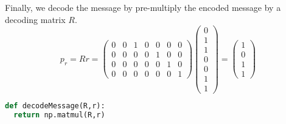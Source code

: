 \documentclass[12pt]{article}
\begin{document}
Finally, we decode the message by pre-multiply the encoded message by a decoding matrix $R$.
\[
  p_r = Rr = 
  \begin{pmatrix}
    0 & 0 & 1 & 0 & 0 & 0 & 0 \\
    0 & 0 & 0 & 0 & 1 & 0 & 0 \\
    0 & 0 & 0 & 0 & 0 & 1 & 0 \\
    0 & 0 & 0 & 0 & 0 & 0 & 1 
  \end{pmatrix} 
  \begin{pmatrix}
    0 \\
    1 \\
    1 \\
    0 \\
    0 \\
    1 \\
    1 
  \end{pmatrix} 
  =
  \begin{pmatrix}
    1 \\
    0 \\
    1 \\
    1
  \end{pmatrix} 
\]
\begin{lstlisting}[frame=single,language=Python,caption=decodeMessage \label{code:makeMessage}]
def decodeMessage(R,r): 
  return np.matmul(R,r)
\end{lstlisting}
\end{document}
